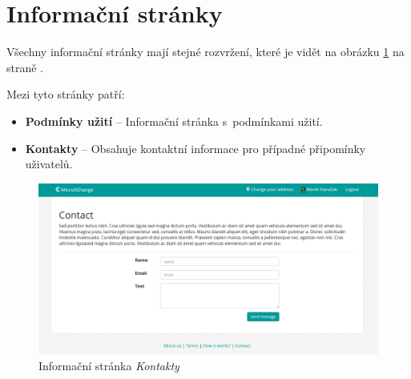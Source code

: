 \section{Informační stránky}
\label{nur:other-sections}

Všechny informační stránky mají stejné rozvržení, které je vidět na obrázku \ref{fig:tur:contact} na straně \pageref{fig:tur:contact}.

Mezi tyto stránky patří:
\begin{itemize}
    \item \textbf{Podmínky užití} -- Informační stránka s~podmínkami užití.
    \item \textbf{Kontakty} -- Obsahuje kontaktní informace pro případné připomínky uživatelů.
\end{itemize}

\begin{figure}[!h]
    \centering
    \includegraphics[width=1.0\textwidth]{media/tur/contact.png}
    \caption{Informační stránka \textit{Kontakty}}
    \label{fig:tur:contact}
\end{figure}